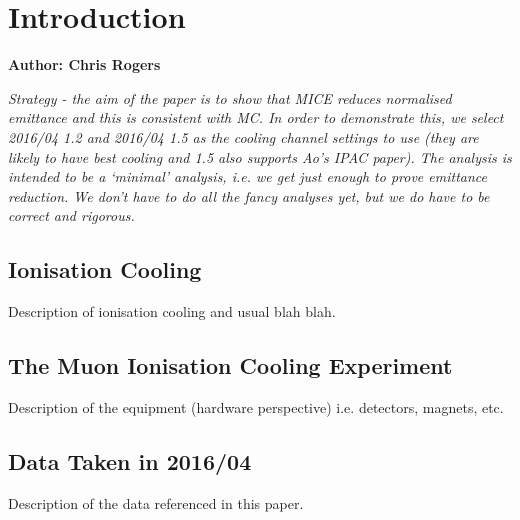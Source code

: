 \section{Introduction}
\label{Sect:Intro}

\textbf{Author: Chris Rogers}

\emph{Strategy - the aim of the paper is to show that MICE reduces normalised 
emittance and this is consistent with MC. In order to demonstrate this, we 
select 2016/04 1.2 and 2016/04 1.5 as the cooling channel settings to use (they 
are likely to have best cooling and 1.5 also supports Ao's IPAC paper). The
analysis is intended to be a `minimal' analysis, i.e. we get just enough to
prove emittance reduction. We don't have to do all the fancy analyses yet, but 
we do have to be correct and rigorous.}

\subsection{Ionisation Cooling}
Description of ionisation cooling and usual blah blah.

\subsection{The Muon Ionisation Cooling Experiment}
Description of the equipment (hardware perspective) i.e. detectors, magnets, etc.

\subsection{Data Taken in 2016/04}
Description of the data referenced in this paper.



